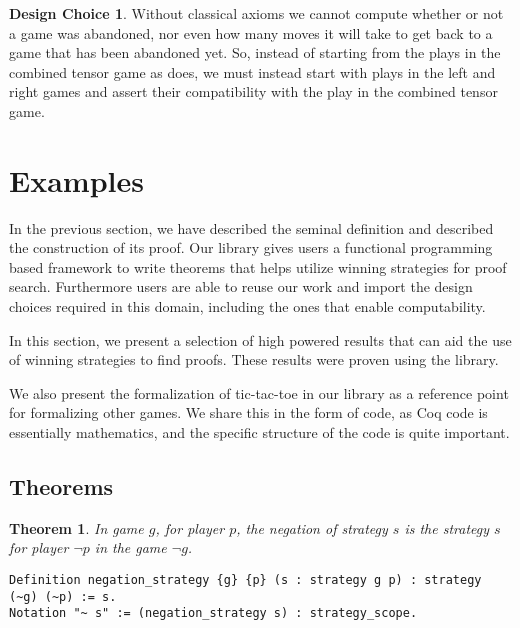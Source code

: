 \documentclass{article}
\newtheorem{thm}{Theorem}
\theoremstyle{definition}
\newtheorem*{designchoice}{Design Choice}
\begin{document}
\begin{designchoice}
Without classical axioms we cannot compute whether or not a game was abandoned, nor even how many moves it will take to get back to a game that has been abandoned yet. So, instead of starting from the plays in the combined tensor game as \textcite{Blass1992} does, we must instead start with plays in the left and right games and assert their compatibility with the play in the combined tensor game. 
\end{designchoice}



\section{Examples}

In the previous section, we have described the seminal definition and described the construction of its proof. Our library gives users a functional programming based framework to write theorems that helps utilize winning strategies for proof search. Furthermore users are able to reuse our work and import the design choices required in this domain, including the ones that enable computability. 

In this section, we present a selection of high powered results that can aid the use of winning strategies to find proofs. These results were proven using the library. 

We also present the formalization of tic-tac-toe in our library as a reference point for formalizing other games. We share this in the form of code, as Coq code is essentially mathematics, and the specific structure of the code is quite important. 

\subsection{Theorems}

\begin{thm}
In game $g$, for player $p$, the  negation of strategy $s$ is the strategy $s$ for player  $\neg p$ in the game $\neg g$.  
\end{thm}

\begin{verbatim}
Definition negation_strategy {g} {p} (s : strategy g p) : strategy (~g) (~p) := s.
Notation "~ s" := (negation_strategy s) : strategy_scope.
\end{verbatim}

$\left.\right.$
\end{document}
